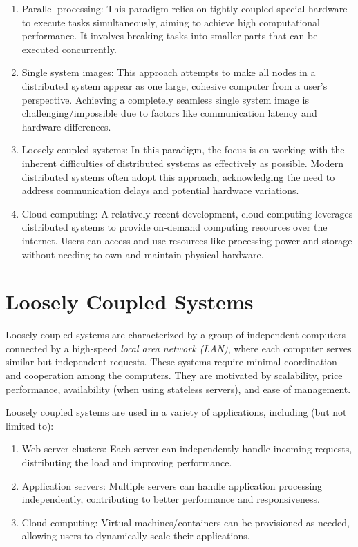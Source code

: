 \documentclass{report}
\newcommand{\exampleBegin}[1]{\begin{tcolorbox}[colback=blue!5!white,colframe=black!75!blue,title={Example:
      #1}]}
\newcommand{\exampleEnd}{\end{tcolorbox}}
\begin{document}
\begin{enumerate}[label=\textit{(\roman*)}]
\item Parallel processing: This paradigm relies on tightly coupled special hardware to execute tasks
  simultaneously, aiming to achieve high computational performance. It involves breaking tasks into
  smaller parts that can be executed concurrently.
\item Single system images: This approach attempts to make all nodes in a distributed system appear
  as one large, cohesive computer from a user's perspective. Achieving a completely seamless single
  system image is challenging/impossible due to factors like communication latency and hardware differences.
\item Loosely coupled systems: In this paradigm, the focus is on working with the inherent
  difficulties of distributed systems as effectively as possible. Modern distributed systems often
  adopt this approach, acknowledging the need to address communication delays and potential hardware
  variations.
\item Cloud computing: A relatively recent development, cloud computing leverages distributed
  systems to provide on-demand computing resources over the internet. Users can access and use
  resources like processing power and storage without needing to own and maintain physical hardware.
\end{enumerate}


\section{Loosely Coupled Systems}
Loosely coupled systems are characterized by a group of independent computers connected by a
high-speed \textit{local area network (LAN)}, where each computer serves similar but independent
requests. These systems require minimal coordination and cooperation among the computers. They are
motivated by scalability, price performance, availability (when using stateless servers), and ease
of management.

\exampleBegin{Couple of Loosers}
Loosely coupled systems are used in a variety of applications, including (but not limited to):
\begin{enumerate}[label=\textit{(\roman*)}]
\item Web server clusters: Each server can independently handle incoming requests, distributing the
  load and improving performance.
\item Application servers: Multiple servers can handle application processing independently,
  contributing to better performance and responsiveness.
\item Cloud computing: Virtual machines/containers can be provisioned as needed, allowing users to
  dynamically scale their applications.
\end{enumerate}
\exampleEnd
\end{document}
